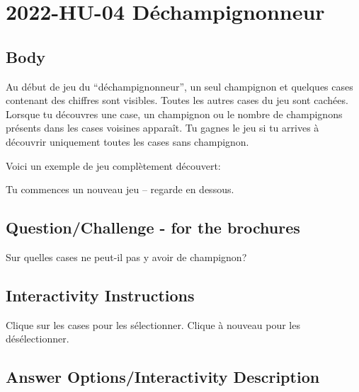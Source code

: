 \documentclass[a4paper,11pt]{report}
\newcommand{\taskGraphicsFolder}{..}
\begin{document}
\section*{\centering{} 2022-HU-04 Déchampignonneur}


\subsection*{Body}

Au début de jeu du “déchampignonneur”, un seul champignon et quelques cases contenant des chiffres sont visibles. Toutes les autres cases du jeu sont cachées. Lorsque tu découvres une case, un champignon ou le nombre de champignons présents dans les cases voisines apparaît. Tu gagnes le jeu si tu arrives à découvrir uniquement toutes les cases sans champignon.

Voici un exemple de jeu complètement découvert:

{\centering%
\par}

Tu commences un nouveau jeu – regarde en dessous.

{\em


\subsection*{Question/Challenge - for the brochures}

Sur quelles cases ne peut-il pas y avoir de champignon?

{\centering%
\par}

}


\subsection*{Interactivity Instructions}

Clique sur les cases pour les sélectionner. Clique à nouveau pour les désélectionner.

\begingroup
\renewcommand{\arraystretch}{1.5}
\subsection*{Answer Options/Interactivity Description}



\endgroup
\end{document}
